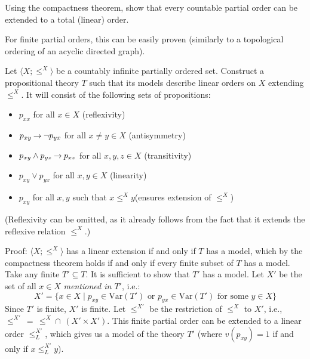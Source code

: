 \begin{problem}
    Using the compactness theorem, show that every countable partial order can be extended to a total (linear) order.

    \begin{solution}

        For finite partial orders, this can be easily proven (similarly to a topological ordering of an acyclic directed graph). 
        
        Let $\langle X;\leq^X\rangle$ be a countably infinite partially ordered set. Construct a propositional theory $T$ such that its models describe linear orders on $X$ extending $\leq^X$. It will consist of the following sets of propositions:
        \begin{itemize}
            \item $p_{xx}$ for all $x\in X$ \hfill (reflexivity)
            \item $p_{xy}\mathbin{\rightarrow}\neg p_{yx}$ for all $x\neq y\in X$ \hfill (antisymmetry)
            \item $p_{xy}\land p_{yz}\mathbin{\rightarrow} p_{xz}$ for all $x,y,z\in X$ \hfill (transitivity)
            \item $p_{xy}\lor p_{yx}$ for all $x,y\in X$ \hfill (linearity)
            \item $p_{xy}$ for all $x,y$ such that $x\leq^X y$\hfill (ensures extension of $\leq^X$)
        \end{itemize}
        (Reflexivity can be omitted, as it already follows from the fact that it extends the reflexive relation $\leq^X$.)

        Proof: $\langle X;\leq^X\rangle$ has a linear extension if and only if $T$ has a model, which by the compactness theorem holds if and only if every finite subset of $T$ has a model. Take any finite $T'\subseteq T$. It is sufficient to show that $T'$ has a model. Let $X'$ be the set of all $x\in X$ \emph{mentioned in $T'$}, i.e.:
        $$
        X'=\{x\in X\mid p_{xy}\in\mathrm{Var}(T')\text{ or }p_{yx}\in\mathrm{Var}(T')\text{ for some }y\in X\}
        $$
        Since $T'$ is finite, $X'$ is finite. Let $\leq^{X'}$ be the restriction of $\leq^X$ to $X'$, i.e., $\leq^{X'}\,=\,\leq^X \mathbin{\cap}\, (X'\times X')$. This finite partial order can be extended to a linear order $\leq^{X'}_L$, which gives us a model of the theory $T'$ (where $v(p_{xy})=1$ if and only if $x\leq^{X'}_L y$).
        
    \end{solution}
    
\end{problem}
        
